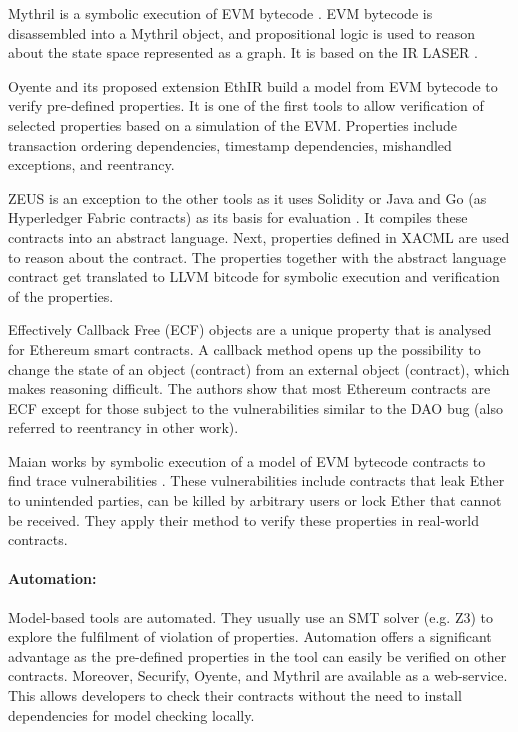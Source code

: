 \documentclass{llncs}
\begin{document}
Mythril is a symbolic execution of EVM bytecode \cite{Mueller2018}. EVM bytecode is disassembled into a Mythril object, and propositional logic is used to reason about the state space represented as a graph. It is based on the IR LASER \cite{Mueller2018LASER}.

Oyente \cite{Luu2016} and its proposed extension EthIR \cite{Albert2018} build a model from EVM bytecode to verify pre-defined properties. It is one of the first tools to allow verification of selected properties based on a simulation of the EVM. Properties include transaction ordering dependencies, timestamp dependencies, mishandled exceptions, and reentrancy.

ZEUS is an exception to the other tools as it uses Solidity or Java and Go (as Hyperledger Fabric contracts) as its basis for evaluation \cite{Kalra2018}. It compiles these contracts into an abstract language. Next, properties defined in XACML are used to reason about the contract. The properties together with the abstract language contract get translated to LLVM bitcode for symbolic execution and verification of the properties.

Effectively Callback Free (ECF) objects are a unique property that is analysed for Ethereum smart contracts\cite{Grossman2017}. A callback method opens up the possibility to change the state of an object (contract) from an external object (contract), which makes reasoning difficult. The authors show that most Ethereum contracts are ECF except for those subject to the vulnerabilities similar to the DAO bug (also referred to reentrancy in other work).

Maian works by symbolic execution of a model of EVM bytecode contracts to find trace vulnerabilities \cite{Nikolic2018}. These vulnerabilities include contracts that leak Ether to unintended parties, can be killed by arbitrary users or lock Ether that cannot be received. They apply their method to verify these properties in real-world contracts.

\paragraph{Automation:} Model-based tools are automated. They usually use an SMT solver (e.g. Z3) to explore the fulfilment of violation of properties. Automation offers a significant advantage as the pre-defined properties in the tool can easily be verified on other contracts. Moreover, Securify, Oyente, and Mythril are available as a web-service. This allows developers to check their contracts without the need to install dependencies for model checking locally.
\end{document}
